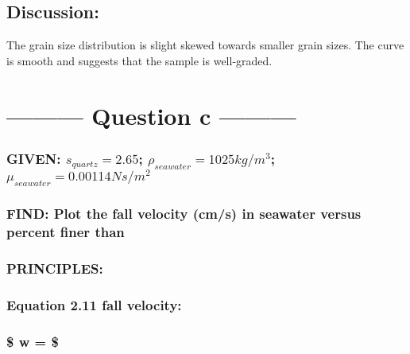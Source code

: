 \documentclass[11pt]{article}
\begin{document}
    \hypertarget{discussion}{%
\subsection{Discussion:}\label{discussion}}

The grain size distribution is slight skewed towards smaller grain
sizes. The curve is smooth and suggests that the sample is well-graded.

    \hypertarget{question-c}{%
\section{--------- Question c ---------}\label{question-c}}

    \hypertarget{given-s_quartz-2.65-rho_seawater-1025-kgm3-mu_seawater-0.00114-nsm2}{%
\subsubsection{\texorpdfstring{{\textbf{GIVEN:}} \(s_{quartz} = 2.65\);
\(\rho_{seawater} = 1025 kg/m^3\);
\(\mu_{seawater} = 0.00114 Ns/m^2\)}{GIVEN: s\_\{quartz\} = 2.65; \textbackslash{}rho\_\{seawater\} = 1025 kg/m\^{}3; \textbackslash{}mu\_\{seawater\} = 0.00114 Ns/m\^{}2}}\label{given-s_quartz-2.65-rho_seawater-1025-kgm3-mu_seawater-0.00114-nsm2}}

\hypertarget{find-plot-the-fall-velocity-cms-in-seawater-versus-percent-finer-than}{%
\subsubsection{\texorpdfstring{{\textbf{FIND:}} Plot the fall velocity
(cm/s) in seawater versus percent finer
than}{FIND: Plot the fall velocity (cm/s) in seawater versus percent finer than}}\label{find-plot-the-fall-velocity-cms-in-seawater-versus-percent-finer-than}}

\hypertarget{principles}{%
\subsubsection{\texorpdfstring{{\textbf{PRINCIPLES:}}}{PRINCIPLES:}}\label{principles}}

\hypertarget{equation-2.11-fall-velocity}{%
\subsubsection{Equation 2.11 fall
velocity:}\label{equation-2.11-fall-velocity}}

\hypertarget{w}{%
\subsubsection{\texorpdfstring{\$ w =
\$}{\$ w = \$}}\label{w}}
\end{document}
